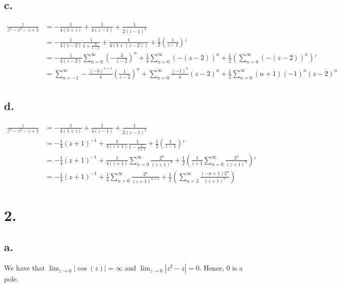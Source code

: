 \documentclass[11pt]{article}
\begin{document}
\subsection*{c.}
\begin{equation*}
    \begin{aligned}
        \frac{z}{z^3-z^2-z+1} 
        &= -\frac{1}{4(1+z)} + \frac{1}{4(z-1)} + \frac{1}{2(z-1)^2} \\
        &= -\frac{1}{4(z-2)} \frac{1}{1 + \frac{3}{z-2}}+ \frac{1}{4(1 + (z-2))} + \frac{1}{2}\left(\frac{1}{z-1}\right)' \\
        &= -\frac{1}{4(z-2)} \sum_{n=0}^\infty \left(-\frac{3}{z-2}\right)^n + \frac{1}{4} \sum_{n=0}^\infty (-(z-2))^n + \frac{1}{2} \left(\sum_{n=0}^\infty (-(z-2))^n \right)' \\
        &= \sum_{n=-1}^\infty -\frac{(-3)^{n+1}}{4} \left(\frac{1}{z-2}\right)^n +  \sum_{n=0}^\infty \frac{(-1)^n}{4}(z-2)^n + \frac{1}{2}\sum_{n=0}^\infty (n+1)(-1)^n(z-2)^n  \\
    \end{aligned}
\end{equation*}
\subsection*{d.}
\begin{equation*}
    \begin{aligned}
        \frac{z}{z^3-z^2-z+1} 
        &= -\frac{1}{4(1+z)} + \frac{1}{4(z-1)} + \frac{1}{2(z-1)^2} \\
        &= -\frac{1}{4}(z+1)^{-1}+ \frac{1}{4(z+1)} \frac{1}{1 - \frac{2}{z+1}} + \frac{1}{2} \left(\frac{1}{z-1}\right)' \\
        &= -\frac{1}{4}(z+1)^{-1} + \frac{1}{4(z+1)} \sum_{n=0}^\infty \frac{2^n}{(z+1)^n} + \frac{1}{2} \left( \frac{1}{z+1} \sum_{n=0}^\infty \frac{2^n}{(z+1)^n} \right)' \\
        &= -\frac{1}{4}(z+1)^{-1} + \frac{1}{4} \sum_{n=0}^\infty \frac{2^n}{(z+1)^{n+1}} + \frac{1}{2} \left(\sum_{n=2}^\infty \frac{(-n+1)2^n}{(z+1)^n} \right)
    \end{aligned}
\end{equation*}
\newpage
\section*{2.}
\subsection*{a.}
We have that $\lim_{z \to 0} |\cos(z)| = \infty$ and $\lim_{z \to 0} |z^2-z| = 0$. 
Hence, $0$ is a pole. 
\end{document}

